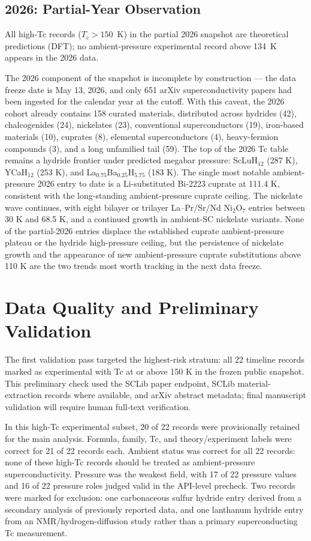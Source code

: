 \documentclass[11pt]{article}
\begin{document}
\subsection{2026: Partial-Year Observation}

All high-Tc records ($T_c > 150$~K) in the partial 2026 snapshot are theoretical predictions (DFT); no ambient-pressure experimental record above 134~K appears in the 2026 data.

The 2026 component of the snapshot is incomplete by construction --- the data freeze date is May 13, 2026, and only 651 arXiv superconductivity papers had been ingested for the calendar year at the cutoff. With this caveat, the 2026 cohort already contains 158 curated materials, distributed across hydrides (42), chalcogenides (24), nickelates (23), conventional superconductors (19), iron-based materials (10), cuprates (8), elemental superconductors (4), heavy-fermion compounds (3), and a long unfamilied tail (59). The top of the 2026 Tc table remains a hydride frontier under predicted megabar pressure: ScLuH$_{12}$ (287 K), YCaH$_{12}$ (253 K), and La$_{0.75}$Ba$_{0.25}$H$_{5.75}$ (183 K). The single most notable ambient-pressure 2026 entry to date is a Li-substituted Bi-2223 cuprate at 111.4 K, consistent with the long-standing ambient-pressure cuprate ceiling. The nickelate wave continues, with eight bilayer or trilayer La--Pr/Sr/Nd Ni$_2$O$_7$ entries between 30 K and 68.5 K, and a continued growth in ambient-SC nickelate variants. None of the partial-2026 entries displace the established cuprate ambient-pressure plateau or the hydride high-pressure ceiling, but the persistence of nickelate growth and the appearance of new ambient-pressure cuprate substitutions above 110 K are the two trends most worth tracking in the next data freeze.

\section{Data Quality and Preliminary Validation}

The first validation pass targeted the highest-risk stratum: all 22 timeline records marked as experimental with Tc at or above 150 K in the frozen public snapshot. This preliminary check used the SCLib paper endpoint, SCLib material-extraction records where available, and arXiv abstract metadata; final manuscript validation will require human full-text verification.

In this high-Tc experimental subset, 20 of 22 records were provisionally retained for the main analysis. Formula, family, Tc, and theory/experiment labels were correct for 21 of 22 records each. Ambient status was correct for all 22 records: none of these high-Tc records should be treated as ambient-pressure superconductivity. Pressure was the weakest field, with 17 of 22 pressure values and 16 of 22 pressure roles judged valid in the API-level precheck. Two records were marked for exclusion: one carbonaceous sulfur hydride entry derived from a secondary analysis of previously reported data, and one lanthanum hydride entry from an NMR/hydrogen-diffusion study rather than a primary superconducting Tc measurement.
\end{document}
